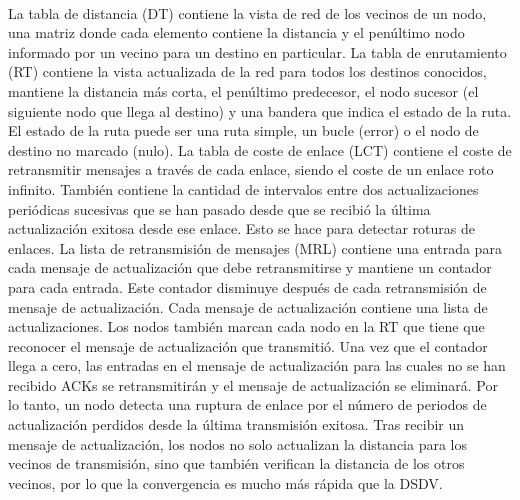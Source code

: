 \documentclass{article}
\begin{document}
\\
	La tabla de distancia (DT) contiene la vista de red de los vecinos de un nodo, una matriz donde cada elemento contiene la distancia y el penúltimo nodo informado por un vecino para un destino en particular. La tabla de enrutamiento (RT) contiene la vista actualizada de la red para todos los destinos conocidos, mantiene la distancia más corta, el penúltimo predecesor, el nodo sucesor (el siguiente nodo que llega al destino) y una bandera que indica el estado de la ruta. El estado de la ruta puede ser una ruta simple, un bucle (error) o el nodo de destino no marcado (nulo). La tabla de coste de enlace (LCT) contiene el coste de retransmitir mensajes a través de cada enlace, siendo el coste de un enlace roto infinito. También contiene la cantidad de intervalos entre dos actualizaciones periódicas sucesivas que se han pasado desde que se recibió la última actualización exitosa desde ese enlace. Esto se hace para detectar roturas de enlaces. La lista de retransmisión de mensajes (MRL) contiene una entrada para cada mensaje de actualización que debe retransmitirse y mantiene un contador para cada entrada. Este contador disminuye después de cada retransmisión de mensaje de actualización. Cada mensaje de actualización contiene una lista de actualizaciones. Los nodos también marcan cada nodo en la RT que tiene que reconocer el mensaje de actualización que transmitió. Una vez que el contador llega a cero, las entradas en el mensaje de actualización para las cuales no se han recibido ACKs se retransmitirán y el mensaje de actualización se eliminará. Por lo tanto, un nodo detecta una ruptura de enlace por el número de periodos de actualización perdidos desde la última transmisión exitosa. Tras recibir un mensaje de actualización, los nodos no solo actualizan la distancia para los vecinos de transmisión, sino que también verifican la distancia de los otros vecinos, por lo que la convergencia es mucho más rápida que la DSDV.                                                                                                                                                                                                                                                                                                                                                                                                                                                                                                                                                                                                                                                
                                                                                                                                                                                                                                                                                                                                                                                                                                                                                                                                                                                                                                               
\end{document}

